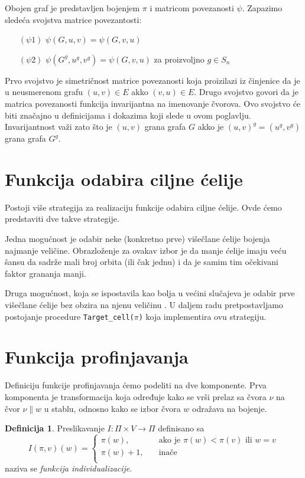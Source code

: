 \documentclass[12pt,oneside]{memoir}
\theoremstyle{definition}
\newtheorem*{definition}{Definicija}
\begin{document}
   Obojen graf je predstavljen bojenjem $\pi$ i matricom povezanosti $\psi$.
   Zapazimo sledeća svojstva matrice povezantosti:
   \begin{itemize}
	   \item[$(\psi1)$] $\psi(G, u, v) = \psi(G, v, u)$
	   \item[$(\psi2)$] $\psi(G^g, u^g, v^g) = \psi(G, v, u)$ za proizvoljno $g \in S_n$
   \end{itemize}
   Prvo svojstvo je simetričnost matrice povezanosti koja proizilazi iz
   činjenice da je u neusmerenom grafu $(u, v) \in E$ akko $(v, u) \in E$.
   Drugo svojstvo govori da je matrica povezanosti funkcija invarijantna na
   imenovanje čvorova. Ovo svojstvo će biti značajno u definicijama i dokazima
   koji slede u ovom poglavlju. Invarijantnost važi zato što je $(u, v)$ grana
   grafa $G$ akko je $(u, v)^g = (u^g, v^g)$ grana grafa $G^g$.

 \section{Funkcija odabira ciljne ćelije}

 Postoji više strategija za realizaciju funkcije odabira ciljne ćelije. Ovde
 ćemo predstaviti dve takve strategije.

 Jedna mogućnost je odabir neke (konkretno prve) višečlane ćelije bojenja
 najmanje veličine. Obrazloženje za ovakav izbor je da manje ćelije imaju veću
 šansu da sadrže mali broj orbita (ili čak jednu) \cite{McKay} i da je samim
 tim očekivani faktor grananja manji.

 Druga mogućnost, koja se ispostavila kao bolja u većini slučajeva je odabir
 prve višečlane ćelije bez obzira na njenu veličinu \cite{McKay}. U daljem radu
 pretpostavljamo postojanje procedure \texttt{Target\_cell($\pi$)} koja
 implementira ovu strategiju.

 \section{Funkcija profinjavanja}

  Definiciju funkcije profinjavanja ćemo podeliti na dve komponente. Prva
  komponenta je transformacija koja određuje kako se vrši prelaz sa čvora $\nu$
  na čvor $\nu \| w$ u stablu, odnosno kako se izbor čvora $w$ odražava na
  bojenje.

  \begin{definition}
	  Preslikavanje $I : \Pi \times V \to \Pi$ definisano sa
	  $$
	  I(\pi, v)(w) =
	  \begin{cases}
		  \pi(w), & \quad \text{ako je } \pi(w) < \pi(v) \text{ ili } w = v \\
		  \pi(w) + 1, & \quad \text{inače}\\
	  \end{cases}
	  $$
	  naziva se \emph{funkcija individualizacije}.
  \end{definition}
\end{document}
